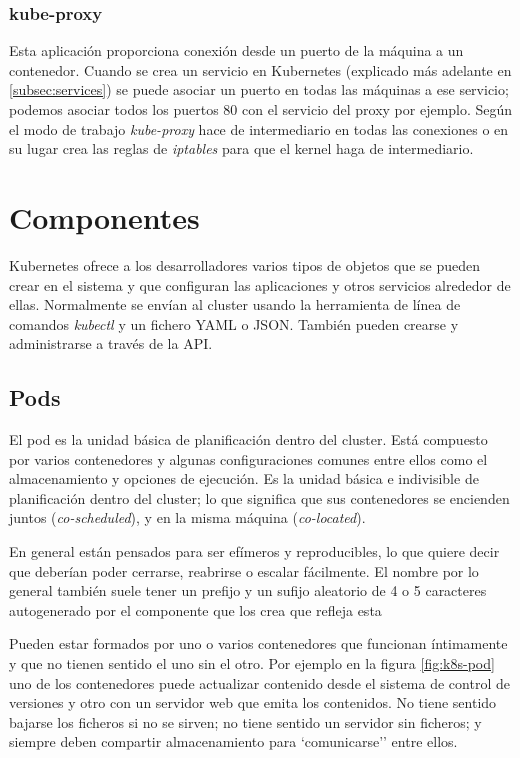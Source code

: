 \subsubsection{kube-proxy}
\label{subsubsec:k8s-proxy}

Esta aplicación proporciona conexión desde un puerto de la máquina a un contenedor. Cuando se crea un servicio en Kubernetes (explicado más adelante en \ref{subsec:services}) se puede asociar un puerto en todas las máquinas a ese servicio; podemos asociar todos los puertos 80 con el servicio del proxy por ejemplo. Según el modo de trabajo \emph{kube-proxy} hace de intermediario en todas las conexiones o en su lugar crea las reglas de \emph{iptables}\cite{iptables} para que el kernel haga de intermediario.

\section{Componentes}
\label{sec:k8s-componentes}

Kubernetes ofrece a los desarrolladores varios tipos de objetos que se pueden crear en el sistema y que configuran las aplicaciones y otros servicios alrededor de ellas. Normalmente se envían al cluster usando la herramienta de línea de comandos \emph{kubectl} y un fichero YAML o JSON. También pueden crearse y administrarse a través de la API.

\subsection{Pods}
\label{subsec:pods}

El pod es la unidad básica de planificación dentro del cluster. Está compuesto por varios contenedores y algunas configuraciones comunes entre ellos como el almacenamiento y opciones de ejecución. Es la unidad básica e indivisible de planificación dentro del cluster; lo que significa que sus contenedores se encienden juntos (\emph{co-scheduled}), y en la misma máquina (\emph{co-located}).

En general están pensados para ser efímeros y reproducibles, lo que quiere decir que deberían poder cerrarse, reabrirse o escalar fácilmente. El nombre por lo general también suele tener un prefijo y un sufijo aleatorio de 4 o 5 caracteres autogenerado por el componente que los crea que refleja esta

Pueden estar formados por uno o varios contenedores que funcionan íntimamente y que no tienen sentido el uno sin el otro. Por ejemplo en la figura \ref{fig:k8s-pod} uno de los contenedores puede actualizar contenido desde el sistema de control de versiones y otro con un servidor web que emita los contenidos. No tiene sentido bajarse los ficheros si no se sirven; no tiene sentido un servidor sin ficheros; y siempre deben compartir almacenamiento para `comunicarse'' entre ellos.

